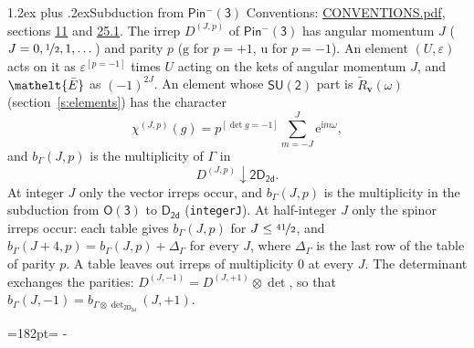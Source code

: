 \documentclass[10pt,a4paper]{article}
\makeatletter
\renewcommand\section{\@startsection{section}{1}{\z@}{-3ex plus -1ex minus -.2ex}%
  {1.2ex plus .2ex}{\normalfont\large\sffamily\bfseries\color{parttitle}}}
\newcommand{\needspace}[1]{\par\penalty-100\begingroup\dimen0=#1\relax\dimen2=\pagegoal
  \advance\dimen2-\pagetotal\ifdim\dimen0>\dimen2\relax\ifdim\dimen2>0pt\vfil\break\fi\fi
  \endgroup}
\numberwithin{equation}{section}
\newcommand{\eltfont}[1]{{\let\sigma\eltsigma\mathelt{#1}}}
\newcommand{\grp}[1]{\mathsf{#1}}
\newcommand{\elt}[1]{\eltfont{#1}}
\newcommand{\ptag}[1]{\mathrm{#1}}
\newcommand{\iverson}[1]{[#1]}
\newcommand{\restr}[2]{#1\!\downarrow#2}
\newcommand{\vv}{\mathbf{v}}
\newcommand{\iunit}{\mathrm{i}}
\newcommand{\expe}{\mathrm{e}}
\newcommand{\irrJp}[2]{D^{(#1,#2)}}
\newcommand{\irrprod}{\otimes}
\newcommand{\barred}[1]{\bar{#1}}
\newcommand{\lift}[1]{\tilde{#1}}
\makeatother
\begin{document}
\section{Subduction from \texorpdfstring{$\grp{Pin^{-}(3)}$}{Pin(3)}}\label{s:subduction_parent}
Conventions: \href{../../CONVENTIONS.pdf}{CONVENTIONS.pdf}, sections \href{../../../rotation/CONVENTIONS.pdf\#conv.11}{11} and \href{../../CONVENTIONS.pdf\#conv.25.1}{25.1}.
\leavevmode\label{n:index.J}\label{n:index.parity}\label{n:irrep.o3}The irrep $\irrJp{J}{p}$ of \href{Pinminus3.pdf}{$\grp{Pin^{-}(3)}$} has angular momentum $J$ ($J = 0, \nicefrac{1}{2}, 1, \dots$) and parity $p$ ($\ptag{g}$ for $p = +1$, $\ptag{u}$ for $p = -1$). An element $(U, \varepsilon)$ acts on it as $\varepsilon^{[p = -1]}$ times $U$ acting on the kets of angular momentum $J$, and $\elt{\barred{E}}$ as $(-1)^{2J}$. \label{n:function.character.parent}\label{n:function.multiplicity}An element whose $\grp{SU(2)}$ part is $\lift{R}_{\vv}(\omega)$ (section~\ref{s:elements}) has the character
\begin{equation}\label{e:chi}\chi^{(J,p)}(g) = p^{\iverson{\det g = -1}}\sum_{m=-J}^{J} \expe^{\iunit m\omega},\end{equation}
and $b_\Gamma(J, p)$ is the multiplicity of $\Gamma$ in
\begin{equation}\label{e:parent}\restr{\irrJp{J}{p}}{\grp{2D_{2d}}}.\end{equation}
At integer $J$ only the vector irreps occur, and $b_\Gamma(J, p)$ is the multiplicity in the subduction from $\grp{O(3)}$ to \href{../../../rotation/data/pdf/D2d.pdf}{$\grp{D_{2d}}$} (\texttt{integerJ}). \label{n:index.increment}At half-integer $J$ only the spinor irreps occur: each table gives $b_\Gamma(J, p)$ for $J \le \nicefrac{41}{2}$, and $b_\Gamma(J + 4, p) = b_\Gamma(J, p) + \Delta_\Gamma$ for every $J$, where $\Delta_\Gamma$ is the last row of the table of parity $p$. A table leaves out irreps of multiplicity 0 at every $J$.
\leavevmode\label{n:operator.determinant.character}The determinant exchanges the parities: $\irrJp{J}{-1} = \irrJp{J}{+1} \irrprod \det$, so that $b_\Gamma(J, -1) = b_{\Gamma \irrprod \det_{\grp{2D_{2d}}}}(J, +1)$.
\needspace{182pt}
\end{document}
